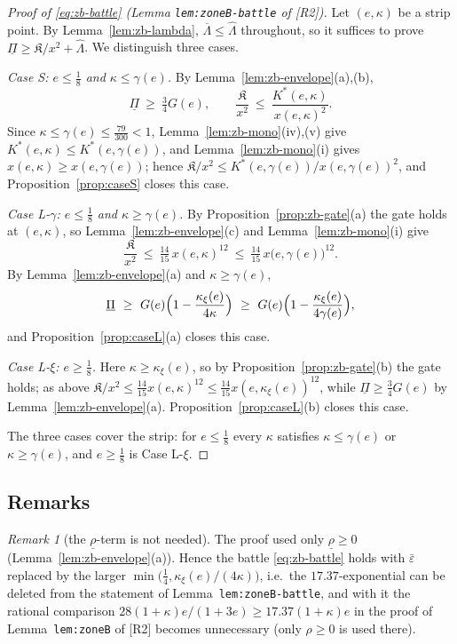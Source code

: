 \documentclass[11pt]{article}
\theoremstyle{remark}
\newtheorem{remark}[theorem]{Remark}
\theoremstyle{plain}
\theoremstyle{plain}
\newcommand{\eps}{\varepsilon}
\newcommand{\Kfrak}{\mathfrak K}
\newcommand{\Kstar}{K^{*}}
\newcommand{\kxi}{\kappa_\xi}
\newcommand{\epsbar}{\bar\eps}
\newcommand{\RII}{[R2]}
\begin{document}
\begin{proof}[Proof of \eqref{eq:zb-battle} \textup{(Lemma
\texttt{lem:zoneB-battle} of \RII)}]
Let $(e,\kappa)$ be a strip point.  By Lemma~\ref{lem:zb-lambda},
$\overline\Lambda\le\widehat\Lambda$ throughout, so it suffices to prove
$\underline\Pi\ge\Kfrak/x^2+\widehat\Lambda$.  We distinguish three cases.

\medskip\noindent
\emph{Case S: $e\le\tfrac18$ and $\kappa\le\gamma(e)$.}
By Lemma~\ref{lem:zb-envelope}(a),(b),
\[
        \underline\Pi\ \ge\ \tfrac34G(e),
        \qquad
        \frac{\Kfrak}{x^2}\ \le\ \frac{\Kstar(e,\kappa)}{x(e,\kappa)^2}.
\]
Since $\kappa\le\gamma(e)\le\tfrac{79}{300}<1$, Lemma~\ref{lem:zb-mono}(iv),(v)
give $\Kstar(e,\kappa)\le\Kstar(e,\gamma(e))$, and Lemma~\ref{lem:zb-mono}(i)
gives $x(e,\kappa)\ge x(e,\gamma(e))$; hence
$\Kfrak/x^2\le\Kstar(e,\gamma(e))/x(e,\gamma(e))^2$, and
Proposition~\ref{prop:caseS} closes this case.

\medskip\noindent
\emph{Case L-$\gamma$: $e\le\tfrac18$ and $\kappa\ge\gamma(e)$.}
By Proposition~\ref{prop:zb-gate}(a) the gate holds at $(e,\kappa)$, so
Lemma~\ref{lem:zb-envelope}(c) and Lemma~\ref{lem:zb-mono}(i) give
\[
        \frac{\Kfrak}{x^2}\ \le\ \tfrac{14}{15}\,x(e,\kappa)^{12}
        \ \le\ \tfrac{14}{15}\,x\bigl(e,\gamma(e)\bigr)^{12}.
\]
By Lemma~\ref{lem:zb-envelope}(a) and $\kappa\ge\gamma(e)$,
\[
        \underline\Pi\ \ge\ G(e)\Bigl(1-\frac{\kxi(e)}{4\kappa}\Bigr)
        \ \ge\ G(e)\Bigl(1-\frac{\kxi(e)}{4\gamma(e)}\Bigr),
\]
and Proposition~\ref{prop:caseL}(a) closes this case.

\medskip\noindent
\emph{Case L-$\xi$: $e\ge\tfrac18$.}
Here $\kappa\ge\kxi(e)$, so by Proposition~\ref{prop:zb-gate}(b) the gate
holds; as above
$\Kfrak/x^2\le\tfrac{14}{15}x(e,\kappa)^{12}
\le\tfrac{14}{15}x(e,\kxi(e))^{12}$, while
$\underline\Pi\ge\tfrac34G(e)$ by Lemma~\ref{lem:zb-envelope}(a).
Proposition~\ref{prop:caseL}(b) closes this case.

\medskip
The three cases cover the strip: for $e\le\tfrac18$ every $\kappa$
satisfies $\kappa\le\gamma(e)$ or $\kappa\ge\gamma(e)$, and $e\ge\tfrac18$
is Case L-$\xi$.
\end{proof}

\subsection{Remarks}

\begin{remark}[the $\underline\rho$-term is not needed]\label{rmk:rho}
The proof used only $\underline\rho\ge0$
(Lemma~\ref{lem:zb-envelope}(a)).  Hence the battle \eqref{eq:zb-battle} holds
with $\epsbar$ replaced by the larger
$\min\bigl(\tfrac14,\kxi(e)/(4\kappa)\bigr)$, i.e.\ the
$17.37$-exponential can be deleted from the statement of
Lemma~\texttt{lem:zoneB-battle}, and with it the rational comparison
$28(1+\kappa)e/(1+3e)\ge17.37(1+\kappa)e$ in the proof of
Lemma~\texttt{lem:zoneB} of \RII{} becomes unnecessary (only
$\rho\ge0$ is used there).
\end{remark}
\end{document}
